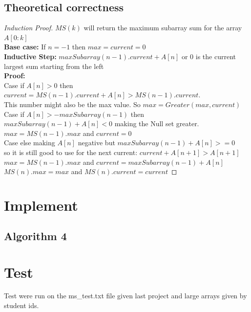 \documentclass[a4paper,10pt]{article}
\begin{document}
\begin{samepage} 
	\section{Theoretical correctness}
		\begin{proof}[Induction Proof]
			$MS(k)$ will return the maximum subarray sum for the array $A[0:k]$\\
			\textbf{Base case:} If $n = -1$ then $max = current = 0$\\
			\textbf{Inductive Step:} $maxSubarray(n-1).current + A[n]$ or 0 is the current largest sum starting from the left\\
			\textbf{Proof:}\\ 
			Case if $A[n] > 0$ then $current = MS(n-1).current + A[n] > MS(n-1).current$. \\
			\indent This number might also be the max value. So $max = Greater(max,current)$\\
			Case if $A[n] >  - maxSubarray(n-1)$ then $maxSubarray(n-1) + A[n] < 0$ making the Null set greater.\\
			\indent $max = MS(n-1).max$ and $current = 0$ \\
			Case else making $A[n]$ negative but $maxSubarray(n-1) + A[n] >= 0$\\
			\indent so it is still good to use for the next current: $current + A[n+1] > A[n+1]$\\
			\indent $max = MS(n-1).max$ and $current = maxSubarray(n-1) + A[n]$\\
			$MS(n).max = max$ and $MS(n).current = current$
			 
		\end{proof}
\end{samepage} 
	\section{Implement}
		\subsection{Algorithm 4}
		
	\section{Test}
		Test were run on the ms_test.txt file given last project and large arrays given by student ids.
\end{document}
